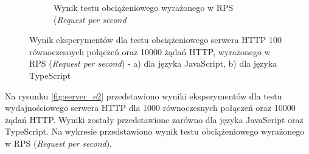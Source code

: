 \begin{figure}[H]
\begin{subfigure}[b]{0.4\textwidth}
    \caption{Wynik testu obciążeniowego wyrażonego w RPS (\textit{Request per second}}
    \label{fig:server_e1_ts}
  \end{subfigure}
  \caption{Wynik eksperymentów dla testu obciążeniowego serwera HTTP 100 równoczesnych połączeń oraz 10000 żądań HTTP, wyrażonego w RPS (\textit{Request per second}) - a) dla języka JavaScript, b) dla języka TypeScript}
  \label{fig:server_e1}
\end{figure}

Na rysunku \ref{fig:server_e2} przedstawiono wyniki eksperymentów dla testu wydajnościowego serwera HTTP dla 1000 równoczesnych połączeń oraz 10000 żądań HTTP. Wyniki zostały przedstawione zarówno dla języka JavaScript oraz TypeScript. Na wykresie przedstawiono wynik testu obciążeniowego wyrażonego w RPS (\textit{Request per second}).

